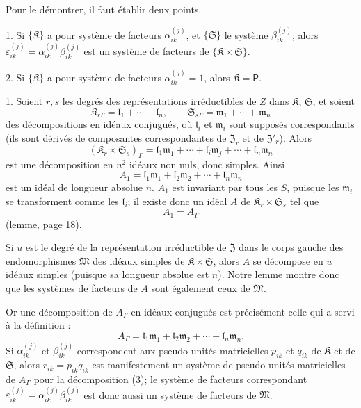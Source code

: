 Pour le démontrer, il faut établir deux points.

1. Si \(\{\mathfrak K\}\) a pour système de facteurs \(\alpha_{ik}^{(j)}\), et \(\{\mathfrak S\}\) le système \(\beta_{ik}^{(j)}\), alors \(\varepsilon_{ik}^{(j)}=\alpha_{ik}^{(j)}\beta_{ik}^{(j)}\) est un système de facteurs de \(\{\mathfrak K\times\mathfrak S\}\).

2. Si \(\{\mathfrak K\}\) a pour système de facteurs \(\alpha_{ik}^{(j)}=1\), alors \(\mathfrak K=\mathsf P\).

1. Soient \(r,s\) les degrés des représentations irréductibles de \(Z\) dans \(\mathfrak K\), \(\mathfrak S\), et soient
\[
\mathfrak K_{r\Gamma}=\mathfrak l_1+\cdots+\mathfrak l_n,\qquad
\mathfrak S_{s\Gamma}=\mathfrak m_1+\cdots+\mathfrak m_n
\]
des décompositions en idéaux conjugués, où \(\mathfrak l_i\) et \(\mathfrak m_i\) sont supposés correspondants (ils sont dérivés de composantes correspondantes de \(\mathfrak Z_r\) et de \(\mathfrak Z'_r\)). Alors
\[
(\mathfrak K_r\times\mathfrak S_s)_\Gamma
=\mathfrak l_1\mathfrak m_1+\cdots+\mathfrak l_i\mathfrak m_j+\cdots+\mathfrak l_n\mathfrak m_n
\]
est une décomposition en \(n^2\) idéaux non nuls, donc simples. Ainsi
\[
A_1=\mathfrak l_1\mathfrak m_1+\mathfrak l_2\mathfrak m_2+\cdots+\mathfrak l_n\mathfrak m_n
\]
est un idéal de longueur absolue \(n\). \(A_1\) est invariant par tous les \(S\), puisque les \(\mathfrak m_i\) se transforment comme les \(\mathfrak l_i\); il existe donc un idéal \(A\) de \(\mathfrak K_r\times\mathfrak S_s\) tel que
\[
A_1=A_\Gamma
\]
(lemme, page 18).

Si \(u\) est le degré de la représentation irréductible de \(\mathfrak Z\) dans le corps gauche des endomorphismes \(\mathfrak M\) des idéaux simples de \(\mathfrak K\times\mathfrak S\), alors \(A\) se décompose en \(u\) idéaux simples (puisque sa longueur absolue est \(n\)). Notre lemme montre donc que les systèmes de facteurs de \(A\) sont également ceux de \(\mathfrak M\).

Or une décomposition de \(A_\Gamma\) en idéaux conjugués est précisément celle qui a servi à la définition :
\[
\tag{3}
A_\Gamma=\mathfrak l_1\mathfrak m_1+\mathfrak l_2\mathfrak m_2+\cdots+\mathfrak l_n\mathfrak m_n.
\]
Si \(\alpha_{ik}^{(j)}\) et \(\beta_{ik}^{(j)}\) correspondent aux pseudo-unités matricielles \(p_{ik}\) et \(q_{ik}\) de \(\mathfrak K\) et de \(\mathfrak S\), alors \(r_{ik}=p_{ik}q_{ik}\) est manifestement un système de pseudo-unités matricielles de \(A_\Gamma\) pour la décomposition (3); le système de facteurs correspondant \(\varepsilon_{ik}^{(j)}=\alpha_{ik}^{(j)}\beta_{ik}^{(j)}\) est donc aussi un système de facteurs de \(\mathfrak M\).

